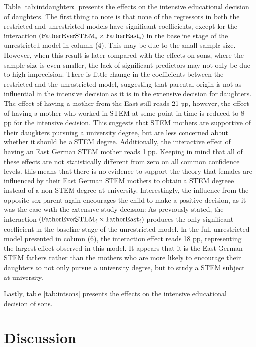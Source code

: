 \documentclass[a4paper, oneside, hyperfootnotes = false]{article}
\begin{document}
{Table \ref{tab:intdaughters} presents the effects on the intensive educational decision of daughters.
The first thing to note is that none of the regressors in both the restricted and unrestricted models have significant coefficients, except for the interaction $(\textnormal{FatherEverSTEM}_{i} \times \textnormal{FatherEast}_{i})$  in the baseline stage of the unrestricted model in column (4).
This may be due to the small sample size.
However, when this result is later compared with the effects on sons, where the sample size is even smaller, the lack of significant predictors may not only be due to high imprecision.
There is little change in the coefficients between the restricted and the unrestricted model, suggesting that parental origin is not as influential in the intensive decision as it is in the extensive decision for daughters.
The effect of having a mother from the East still reads 21 pp, however, the effect of having a mother who worked in STEM at some point in time is reduced to 8 pp for the intensive decision.
This suggests that STEM mothers are supportive of their daughters pursuing a university degree, but are less concerned about whether it should be a STEM degree.
Additionally, the interactive effect of having an East German STEM mother reads 1 pp.
Keeping in mind that all of these effects are not statistically different from zero on all common confidence levels, this means that there is no evidence to support the theory that females are influenced by their East German STEM mothers to obtain a STEM degreee instead of a non-STEM degree at university.
Interestingly, the influence from the opposite-sex parent again encourages the child to make a positive decision, as it was the case with the extensive study decision:
As previously stated, the interaction $(\textnormal{FatherEverSTEM}_{i} \times \textnormal{FatherEast}_{i})$ produces the only significant coefficient in the baseline stage of the unrestricted model.
In the full unrestricted model presented in column (6), the interaction effect reads 18 pp, representing the largest effect observed in this model.
It appears that it is the East German STEM fathers rather than the mothers who are more likely to encourage their daughters to not only pursue a university degree, but to study a STEM subject at university.

Lastly, table \ref{tab:intsons} presents the effects on the intensive educational decision of sons.


\section{Discussion}
\label{discussion}

}
\end{document}
